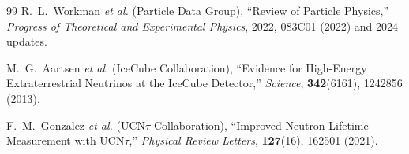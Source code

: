 \documentclass[12pt,a4paper]{article}
\begin{document}
\begin{thebibliography}{99}
		R.~L.~Workman \textit{et al.} (Particle Data Group),
		``Review of Particle Physics,''
		\textit{Progress of Theoretical and Experimental Physics}, 2022, 083C01 (2022) and 2024 updates.
		
		M.~G.~Aartsen \textit{et al.} (IceCube Collaboration),
		``Evidence for High-Energy Extraterrestrial Neutrinos at the IceCube Detector,''
		\textit{Science}, \textbf{342}(6161), 1242856 (2013).
		
		F.~M.~Gonzalez \textit{et al.} (UCN$\tau$ Collaboration), 
		``Improved Neutron Lifetime Measurement with UCN$\tau$,''
		\textit{Physical Review Letters}, \textbf{127}(16), 162501 (2021).
		
	\end{thebibliography}
	
\end{document}
